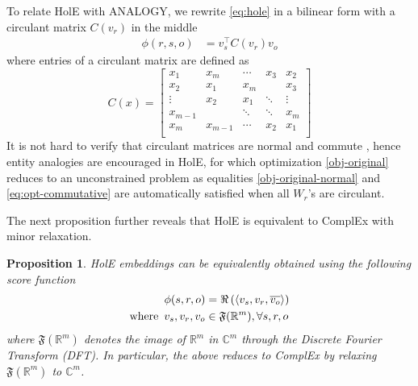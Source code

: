 \documentclass{article}
\newcommand{\fft}{\mathfrak{F}}
\newtheorem{proposition}{Proposition}[section]
\begin{document}
To relate HolE with ANALOGY,
we rewrite \eqref{eq:hole} in a bilinear form with a circulant matrix $C(v_r)$ in the middle 
\begin{align}
    \phi(r, s, o)
    &= v_s^\top 
    C(v_r)
    v_o
\end{align}
where entries of a circulant matrix are defined as
\begin{equation}
    C(x) = 
    \begin{bmatrix}
        x_1 & x_m & \cdots & x_3 & x_2 \\
        x_2 & x_1 & x_m & & x_3 \\
        \vdots & x_2 & x_1 & \ddots & \vdots \\
        x_{m-1} & & \ddots & \ddots & x_m \\
        x_{m} & x_{m-1} & \cdots & x_2 & x_1 \\
    \end{bmatrix}
\end{equation}
It is not hard to verify that circulant matrices are normal
and commute \cite{gray2006toeplitz},
hence entity analogies are encouraged in HolE,
for which optimization \eqref{obj-original} reduces to an unconstrained problem
as equalities \eqref{obj-original-normal} and \eqref{eq:opt-commutative} are automatically satisfied when all $W_r$'s are circulant.

The next proposition
further reveals that HolE is equivalent to ComplEx with minor relaxation.
\begin{proposition}
    HolE embeddings can be equivalently obtained using the following score function 
    \begin{align}
        \phi(s, r, o) &= \Re\left( \langle v_s, v_r, \overline{v_o} \rangle \right) \\
        \text{where} \enskip v_s, v_r, v_o &\in \fft(\mathbb{R}^m), \forall s, r, o
    \end{align}
    where $\fft(\mathbb{R}^m)$ denotes the image of $\mathbb{R}^m$ in $\mathbb{C}^m$ through the Discrete Fourier Transform (DFT).
    In particular, the above reduces to ComplEx by relaxing $\fft(\mathbb{R}^m)$ to $\mathbb{C}^m$.
\end{proposition}
\end{document}
